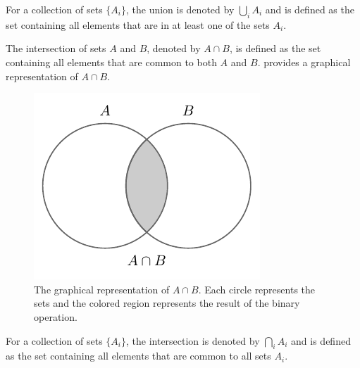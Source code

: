 \begin{definition}
	For a collection of sets $\{A_i\}$, the union is denoted by $\bigcup_{i} A_i$ and is defined as the set containing all elements that are in at least one of the sets $A_i$.
\end{definition}

\begin{definition}[Intersection]
	The intersection of sets $A$ and $B$, denoted by $A \cap B$, is defined as the set containing all elements that are common to both $A$ and $B$.  provides a graphical representation of $A \cap B$.
	\begin{figure}[H]
		\centering
		\includegraphics[]{figures/set_intersection.pdf}
		\caption{The graphical representation of $A\cap B$. Each circle represents the sets and the colored region represents the result of the binary operation.}
		\label{fig:set_intersection}
	\end{figure}
\end{definition}

\begin{definition}
	For a collection of sets $\{A_i\}$, the intersection is denoted by $\bigcap_{i} A_i$ and is defined as the set containing all elements that are common to all sets $A_i$.
\end{definition}

